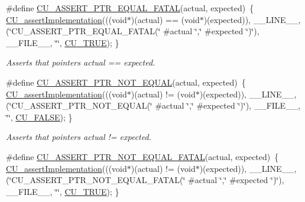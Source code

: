 \begin{DoxyCompactItemize}
\#define \hyperlink{group___framework_ga6698c1d77f53a296cc34db3a9ceeb895}{C\+U\+\_\+\+A\+S\+S\+E\+R\+T\+\_\+\+P\+T\+R\+\_\+\+E\+Q\+U\+A\+L\+\_\+\+F\+A\+T\+A\+L}(actual, expected)~\{ \hyperlink{group___framework_gad409fc536d9d3fb5f659c76421e8ce3b}{C\+U\+\_\+assert\+Implementation}(((void$\ast$)(actual) == (void$\ast$)(expected)), \+\_\+\+\_\+\+L\+I\+N\+E\+\_\+\+\_\+, (\char`\"{}C\+U\+\_\+\+A\+S\+S\+E\+R\+T\+\_\+\+P\+T\+R\+\_\+\+E\+Q\+U\+A\+L\+\_\+\+F\+A\+T\+A\+L(\char`\"{} \#actual \char`\"{},\char`\"{} \#expected \char`\"{})\char`\"{}), \+\_\+\+\_\+\+F\+I\+L\+E\+\_\+\+\_\+, \char`\"{}\char`\"{}, \hyperlink{group___framework_ga99641394bc766ca9c4a295e942fed1ef}{C\+U\+\_\+\+T\+R\+U\+E}); \}
\begin{DoxyCompactList}\small\item\em Asserts that pointers actual == expected. \end{DoxyCompactList}\item 
\#define \hyperlink{group___framework_gab18ddeb24a2c2efbe890b27f6c538bd9}{C\+U\+\_\+\+A\+S\+S\+E\+R\+T\+\_\+\+P\+T\+R\+\_\+\+N\+O\+T\+\_\+\+E\+Q\+U\+A\+L}(actual, expected)~\{ \hyperlink{group___framework_gad409fc536d9d3fb5f659c76421e8ce3b}{C\+U\+\_\+assert\+Implementation}(((void$\ast$)(actual) != (void$\ast$)(expected)), \+\_\+\+\_\+\+L\+I\+N\+E\+\_\+\+\_\+, (\char`\"{}C\+U\+\_\+\+A\+S\+S\+E\+R\+T\+\_\+\+P\+T\+R\+\_\+\+N\+O\+T\+\_\+\+E\+Q\+U\+A\+L(\char`\"{} \#actual \char`\"{},\char`\"{} \#expected \char`\"{})\char`\"{}), \+\_\+\+\_\+\+F\+I\+L\+E\+\_\+\+\_\+, \char`\"{}\char`\"{}, \hyperlink{group___framework_ga7453214541b156ef868681eaafe60860}{C\+U\+\_\+\+F\+A\+L\+S\+E}); \}
\begin{DoxyCompactList}\small\item\em Asserts that pointers actual != expected. \end{DoxyCompactList}\item 
\#define \hyperlink{group___framework_gab171ca2c6f29568150372c0bf0657c00}{C\+U\+\_\+\+A\+S\+S\+E\+R\+T\+\_\+\+P\+T\+R\+\_\+\+N\+O\+T\+\_\+\+E\+Q\+U\+A\+L\+\_\+\+F\+A\+T\+A\+L}(actual, expected)~\{ \hyperlink{group___framework_gad409fc536d9d3fb5f659c76421e8ce3b}{C\+U\+\_\+assert\+Implementation}(((void$\ast$)(actual) != (void$\ast$)(expected)), \+\_\+\+\_\+\+L\+I\+N\+E\+\_\+\+\_\+, (\char`\"{}C\+U\+\_\+\+A\+S\+S\+E\+R\+T\+\_\+\+P\+T\+R\+\_\+\+N\+O\+T\+\_\+\+E\+Q\+U\+A\+L\+\_\+\+F\+A\+T\+A\+L(\char`\"{} \#actual \char`\"{},\char`\"{} \#expected \char`\"{})\char`\"{}), \+\_\+\+\_\+\+F\+I\+L\+E\+\_\+\+\_\+, \char`\"{}\char`\"{}, \hyperlink{group___framework_ga99641394bc766ca9c4a295e942fed1ef}{C\+U\+\_\+\+T\+R\+U\+E}); \}

\end{DoxyCompactItemize}
